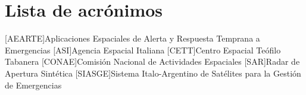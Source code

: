 \chapter*{Lista de acrónimos}
\label{chap:acronimos}

\begin{acronym}[SAOCOM]
[AEARTE]{Aplicaciones Espaciales de Alerta y Respuesta Temprana a Emergencias}
[ASI]{Agencia Espacial Italiana}
[CETT]{Centro Espacial Teófilo Tabanera}
[CONAE]{Comisión Nacional de Actividades Espaciales}
[SAR]{Radar de Apertura Sintética}
[SIASGE]{Sistema Italo-Argentino de Satélites para la Gestión de Emergencias}
\end{acronym}


